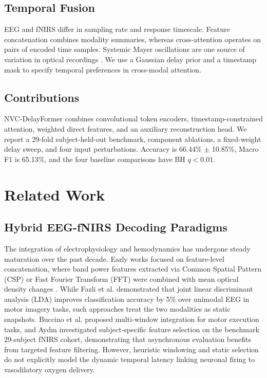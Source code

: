 \documentclass[final,5p,times,twocolumn]{elsarticle}
\begin{document}
\subsection{Temporal Fusion}
EEG and fNIRS differ in sampling rate and response timescale. Feature concatenation combines modality summaries, whereas cross-attention operates on pairs of encoded time samples. Systemic Mayer oscillations are one source of variation in optical recordings \cite{julien2006enigma}. We use a Gaussian delay prior and a timestamp mask to specify temporal preferences in cross-modal attention.

\subsection{Contributions}
NVC-DelayFormer combines convolutional token encoders, timestamp-constrained attention, weighted direct features, and an auxiliary reconstruction head. We report a 29-fold subject-held-out benchmark, component ablations, a fixed-weight delay sweep, and four input perturbations. Accuracy is 66.44\% $\pm$ 10.85\%, Macro F1 is 65.13\%, and the four baseline comparisons have BH $q<0.01$.

\section{Related Work}
\label{sec:related}

\subsection{Hybrid EEG-fNIRS Decoding Paradigms}
The integration of electrophysiology and hemodynamics has undergone steady maturation over the past decade. Early works focused on feature-level concatenation, where band power features extracted via Common Spatial Pattern (CSP) or Fast Fourier Transform (FFT) were combined with mean optical density changes \cite{fazli2012enhanced}. While Fazli et al. demonstrated that joint linear discriminant analysis (LDA) improves classification accuracy by 5\% over unimodal EEG in motor imagery tasks, such approaches treat the two modalities as static snapshots. Buccino et al. \cite{buccino2016hybrid} proposed multi-window integration for motor execution tasks, and Ayd{\i}n \cite{aydin2020subject} investigated subject-specific feature selection on the benchmark 29-subject fNIRS cohort, demonstrating that asynchronous evaluation benefits from targeted feature filtering. However, heuristic windowing and static selection do not explicitly model the dynamic temporal latency linking neuronal firing to vasodilatory oxygen delivery.
\end{document}
